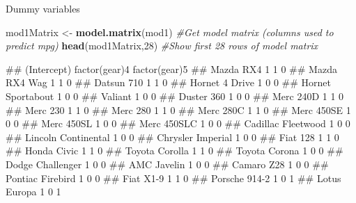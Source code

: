 \documentclass[
  ignorenonframetext,
  aspectratio=169]{beamer}
\newenvironment{Shaded}{\begin{snugshade}}{\end{snugshade}}
\newcommand{\CommentTok}[1]{\textcolor[rgb]{0.56,0.35,0.01}{\textit{#1}}}
\newcommand{\DecValTok}[1]{\textcolor[rgb]{0.00,0.00,0.81}{#1}}
\newcommand{\FunctionTok}[1]{\textcolor[rgb]{0.13,0.29,0.53}{\textbf{#1}}}
\newcommand{\NormalTok}[1]{#1}
\newcommand{\OtherTok}[1]{\textcolor[rgb]{0.56,0.35,0.01}{#1}}
\let\oldShaded\Shaded %
\let\endoldShaded\endShaded
\renewenvironment{Shaded}{\scriptsize\oldShaded}{\endoldShaded}
\let\oldverbatim\verbatim %
\let\endoldverbatim\endverbatim
\renewenvironment{verbatim}{\tiny\oldverbatim}{\endoldverbatim}
\begin{document}
\begin{frame}[fragile]{Dummy variables}
\protect\hypertarget{dummy-variables}{}
\tiny

\begin{Shaded}
\begin{Highlighting}[]
\NormalTok{mod1Matrix }\OtherTok{\textless{}{-}} \FunctionTok{model.matrix}\NormalTok{(mod1) }\CommentTok{\#Get model matrix (columns used to predict mpg)}
\FunctionTok{head}\NormalTok{(mod1Matrix,}\DecValTok{28}\NormalTok{) }\CommentTok{\#Show first 28 rows of model matrix}
\end{Highlighting}
\end{Shaded}

\begin{verbatim}
##                     (Intercept) factor(gear)4 factor(gear)5
## Mazda RX4                     1             1             0
## Mazda RX4 Wag                 1             1             0
## Datsun 710                    1             1             0
## Hornet 4 Drive                1             0             0
## Hornet Sportabout             1             0             0
## Valiant                       1             0             0
## Duster 360                    1             0             0
## Merc 240D                     1             1             0
## Merc 230                      1             1             0
## Merc 280                      1             1             0
## Merc 280C                     1             1             0
## Merc 450SE                    1             0             0
## Merc 450SL                    1             0             0
## Merc 450SLC                   1             0             0
## Cadillac Fleetwood            1             0             0
## Lincoln Continental           1             0             0
## Chrysler Imperial             1             0             0
## Fiat 128                      1             1             0
## Honda Civic                   1             1             0
## Toyota Corolla                1             1             0
## Toyota Corona                 1             0             0
## Dodge Challenger              1             0             0
## AMC Javelin                   1             0             0
## Camaro Z28                    1             0             0
## Pontiac Firebird              1             0             0
## Fiat X1-9                     1             1             0
## Porsche 914-2                 1             0             1
## Lotus Europa                  1             0             1
\end{verbatim}
\end{frame}
\end{document}
